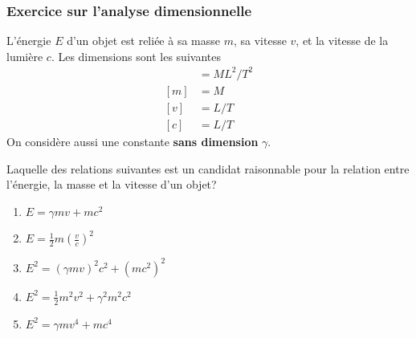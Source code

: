\documentclass{beamer}
\begin{document}
\begin{frame}
  \frametitle{Exercice sur l'analyse dimensionnelle}

  L'énergie $E$ d'un objet est reliée à sa masse $m$, sa vitesse $v$, et la
  vitesse de la lumière $c$.  Les dimensions sont les suivantes
  \begin{align*}
    [E] &= ML^2/T^2 \\
    [m] &= M \\
    [v] &= L/T \\
    [c] &= L/T
  \end{align*}
  On considère aussi une constante \textbf{sans dimension} $\gamma$.

  Laquelle des relations suivantes est un candidat raisonnable pour la relation
  entre l'énergie, la masse et la vitesse d'un objet?

  \begin{enumerate}
    \item $E = \gamma mv + mc^2$
    \item $E = \frac{1}{2} m \left(\frac{v}{c}\right)^2$
    \item $E^2 = (\gamma mv)^2c^2 + (mc^2)^2$
    \item $E^2 = \frac{1}{2} m^2v^2 + \gamma^2m^2c^2$
    \item $E^2 = \gamma m v^4 + mc^4$
  \end{enumerate}
\end{frame}
\end{document}
